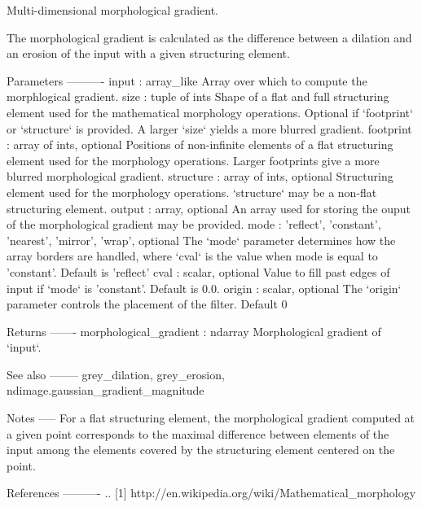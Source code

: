 \begin{DoxyVerb}Multi-dimensional morphological gradient.

The morphological gradient is calculated as the difference between a
dilation and an erosion of the input with a given structuring element.

Parameters
----------
input : array_like
    Array over which to compute the morphlogical gradient.
size : tuple of ints
    Shape of a flat and full structuring element used for the mathematical
    morphology operations. Optional if `footprint` or `structure` is
    provided. A larger `size` yields a more blurred gradient.
footprint : array of ints, optional
    Positions of non-infinite elements of a flat structuring element
    used for the morphology operations. Larger footprints
    give a more blurred morphological gradient.
structure : array of ints, optional
    Structuring element used for the morphology operations.
    `structure` may be a non-flat structuring element.
output : array, optional
    An array used for storing the ouput of the morphological gradient
    may be provided.
mode : {'reflect', 'constant', 'nearest', 'mirror', 'wrap'}, optional
    The `mode` parameter determines how the array borders are
    handled, where `cval` is the value when mode is equal to
    'constant'. Default is 'reflect'
cval : scalar, optional
    Value to fill past edges of input if `mode` is 'constant'. Default
    is 0.0.
origin : scalar, optional
    The `origin` parameter controls the placement of the filter.
    Default 0

Returns
-------
morphological_gradient : ndarray
    Morphological gradient of `input`.

See also
--------
grey_dilation, grey_erosion, ndimage.gaussian_gradient_magnitude

Notes
-----
For a flat structuring element, the morphological gradient
computed at a given point corresponds to the maximal difference
between elements of the input among the elements covered by the
structuring element centered on the point.

References
----------
.. [1] http://en.wikipedia.org/wiki/Mathematical_morphology


\end{DoxyVerb}
